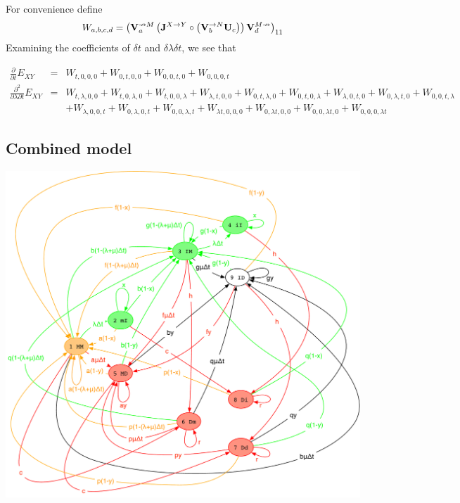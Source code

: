 \documentclass{article}
\begin{document}
For convenience define
\[
W_{a,b,c,d} =
\left( {\bf V}^{\nrightarrow M}_a \left( {\bf J}^{X \to Y} \circ \left( {\bf V}^{\rightarrow N}_b {\bf U}_c \right) \right) {\bf V}^{M \nrightarrow}_d \right)_{11}
\]
Examining the coefficients of $\delta t$ and $\delta \lambda \delta t$, we see that

\begin{eqnarray*}
  \frac{\partial}{\partial t}E_{XY} & = &
  W_{t,0,0,0} + W_{0,t,0,0} + W_{0,0,t,0} + W_{0,0,0,t}
  \\
  \frac{\partial^2}{\partial \lambda \partial t}E_{XY} & = &
  W_{t,\lambda,0,0} + W_{t,0,\lambda,0} + W_{t,0,0,\lambda}
  + W_{\lambda,t,0,0} + W_{0,t,\lambda,0} + W_{0,t,0,\lambda}
  + W_{\lambda,0,t,0} + W_{0,\lambda,t,0} + W_{0,0,t,\lambda}
  \\ & &
  + W_{\lambda,0,0,t} + W_{0,\lambda,0,t} + W_{0,0,\lambda,t}
  + W_{\lambda t,0,0,0} + W_{0,\lambda t,0,0} + W_{0,0,\lambda t,0} + W_{0,0,0,\lambda t}
\end{eqnarray*}


\subsection{Combined model}

\includegraphics[width=\textwidth]{PairInstant.pdf}
\end{document}
